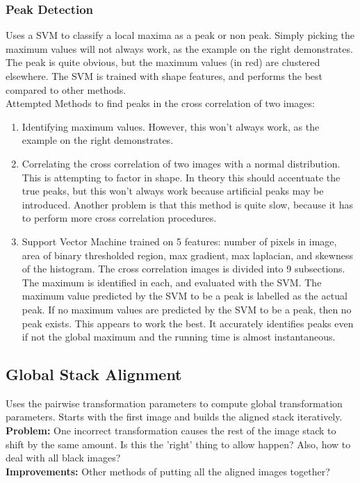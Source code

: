 \documentclass{article}
\begin{document}
\subsubsection{Peak Detection}

Uses a SVM to classify a local maxima as a peak or non peak. 
Simply picking the maximum values will not always work, as the example on the right demonstrates. The peak is quite obvious, but the maximum values (in red) are clustered elsewhere. The SVM is trained with shape features, and performs the best compared to other methods.\\
Attempted Methods to find peaks in the cross correlation of two images:

\begin{enumerate}
\item Identifying maximum values. However, this won't always work, as the example on the right demonstrates.
\item Correlating the cross correlation of two images with a normal distribution. This is attempting to factor in shape. In theory this should accentuate the true peaks, but this won't always work because artificial peaks may be introduced. Another problem is that this method is quite slow, because it has to perform more cross correlation procedures. 
\item Support Vector Machine trained on 5 features: number of pixels in image, area of binary thresholded region, max gradient, max laplacian, and skewness of the histogram. The cross correlation images is divided into 9 subsections. The maximum is identified in each, and evaluated with the SVM. The maximum value predicted by the SVM to be a peak is labelled as the actual peak. If no maximum values are predicted by the SVM to be a peak, then no peak exists. This appears to work the best. It accurately identifies peaks even if not the global maximum and the running time is almost instantaneous.
\end{enumerate}

\subsection{Global Stack Alignment}
Uses the pairwise transformation parameters to compute global transformation parameters. Starts with the first image and builds the aligned stack iteratively. \\
\textbf{Problem:} One incorrect transformation causes the rest of the image stack to shift by the same amount. Is this the 'right' thing to allow happen? Also, how to deal with all black images? \\
\textbf{Improvements:} Other methods of putting all the aligned images together?
\end{document}
